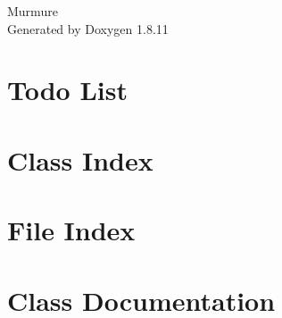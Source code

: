 \documentclass[twoside]{book}
\newcommand{\+}{\discretionary{\mbox{\scriptsize$\hookleftarrow$}}{}{}}
\newcommand{\clearemptydoublepage}{%
  \newpage{\pagestyle{empty}\cleardoublepage}%
}
\begin{document}
\hypersetup{pageanchor=false,
             bookmarksnumbered=true,
             pdfencoding=unicode
            }
\begin{titlepage}
\vspace*{7cm}
\begin{center}%
{\Large Murmure }\\
\vspace*{1cm}
{\large Generated by Doxygen 1.8.11}\\
\end{center}
\end{titlepage}
\clearemptydoublepage
\tableofcontents
\clearemptydoublepage
{}
\hypersetup{pageanchor=true}

\chapter{Todo List}
\label{todo}
\hypertarget{todo}{}

\chapter{Class Index}

\chapter{File Index}

\chapter{Class Documentation}




























\end{document}
